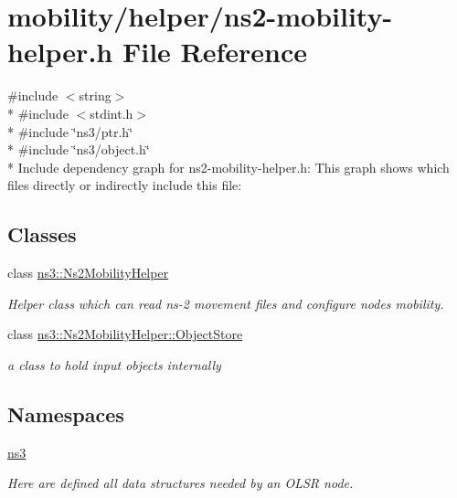 \hypertarget{ns2-mobility-helper_8h}{}\section{mobility/helper/ns2-\/mobility-\/helper.h File Reference}
\label{ns2-mobility-helper_8h}
{\ttfamily \#include $<$string$>$}\\*
{\ttfamily \#include $<$stdint.\+h$>$}\\*
{\ttfamily \#include \char`\"{}ns3/ptr.\+h\char`\"{}}\\*
{\ttfamily \#include \char`\"{}ns3/object.\+h\char`\"{}}\\*
Include dependency graph for ns2-\/mobility-\/helper.h\+:
This graph shows which files directly or indirectly include this file\+:
\subsection*{Classes}
\begin{DoxyCompactItemize}
\item 
class \hyperlink{classns3_1_1Ns2MobilityHelper}{ns3\+::\+Ns2\+Mobility\+Helper}
\begin{DoxyCompactList}\small\item\em Helper class which can read ns-\/2 movement files and configure nodes mobility. \end{DoxyCompactList}\item 
class \hyperlink{classns3_1_1Ns2MobilityHelper_1_1ObjectStore}{ns3\+::\+Ns2\+Mobility\+Helper\+::\+Object\+Store}
\begin{DoxyCompactList}\small\item\em a class to hold input objects internally \end{DoxyCompactList}\end{DoxyCompactItemize}
\subsection*{Namespaces}
\begin{DoxyCompactItemize}
\item 
 \hyperlink{namespacens3}{ns3}
\begin{DoxyCompactList}\small\item\em Here are defined all data structures needed by an O\+L\+SR node. \end{DoxyCompactList}\end{DoxyCompactItemize}
